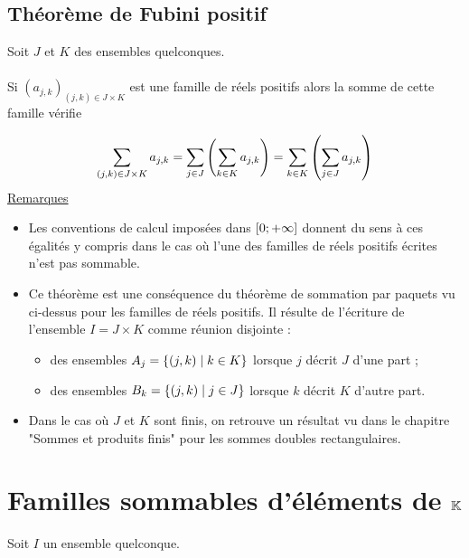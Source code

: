 \subsection{Théorème de Fubini positif}
\begin{theo}
    Soit \(J\) et \(K\) des ensembles quelconques.\\~\\
    Si \((a_{j,k})_{(j,k)\in J\times K}\)  est une famille de réels positifs alors la somme de cette famille vérifie

    \[\sum_{(j,k)\in J\times K}a_{j,k} = \sum_{j\in J}\left(\sum_{k\in K} a_{j,k}\right)= \sum_{k\in K}\left(\sum_{j\in J} a_{j,k}\right)\]
    \underline{Remarques}
    \begin{itemize}
        \item Les conventions de calcul imposées dans \(\left[0;+\infty\right]\) donnent du sens à ces égalités y compris dans le cas où l’une des familles de réels positifs écrites n’est pas sommable.
        \item Ce théorème est une conséquence du théorème de sommation par paquets vu ci-dessus pour les familles de réels positifs. Il résulte de l’écriture de l’ensemble \(I = J \times K\)  comme réunion disjointe :
        \begin{itemize}
            \item  des ensembles \(A_j =\left\lbrace(j, k) \;\middle|\; k \in K  \right\rbrace\) lorsque \(j\) décrit \(J\) d’une part ;
            \item  des ensembles \(B_k = \left\lbrace(j, k) \;\middle|\; j \in  J\right\rbrace\) lorsque \(k\) décrit \(K\)   d’autre part.
        \end{itemize}
        \item Dans le cas où \(J\) et \(K\)   sont finis, on retrouve un résultat vu dans le chapitre "Sommes et produits finis" pour les sommes doubles rectangulaires.
    \end{itemize}
\end{theo}

\section{Familles sommables d’éléments de \(\mathbb{K}\)  }
    Soit \(I\) un ensemble quelconque.
